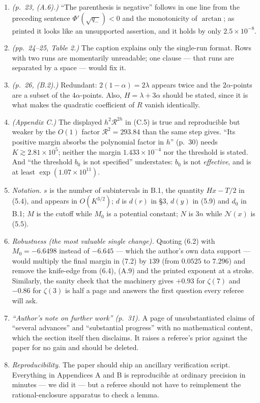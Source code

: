 \documentclass[11pt]{article}
\theoremstyle{definition}
\begin{document}
\begin{enumerate}
three pieces. The cancellation between the zero block and the ordinary block should be described
as a cancellation rather than as an omission.
\item \emph{(p.~23, (A.6).)} ``The parenthesis is negative'' follows in one line from the
preceding sentence $\Phi'(\sqrt{q_-})<0$ and the monotonicity of $\arctan$; as printed it looks
like an unsupported assertion, and it holds by only $2.5\times10^{-8}$.
\item \emph{(pp.~24--25, Table 2.)} The caption explains only the single-run format. Rows with
two runs are momentarily unreadable; one clause --- that runs are separated by a space --- would
fix it.
\item \emph{(p.~26, (B.2).)} Redundant: $2(1-\alpha)=2\lambda$ appears twice and the
$2\alpha$-points are a subset of the $4\alpha$-points. Also, $H=\lambda+3\alpha$ should be stated,
since it is what makes the quadratic coefficient of $R$ vanish identically.
\item \emph{(Appendix C.)} The displayed $h^2\mathcal{R}^{2h}$ in (C.5) is true and reproducible
but weaker by the $O(1)$ factor $\mathcal{R}^2=293.84$ than the same step gives. ``Its positive
margin absorbs the polynomial factor in $h$'' (p.~30) needs $K\gtrsim2.81\times10^5$; neither the
margin $1.433\times10^{-4}$ nor the threshold is stated. And ``the threshold $b_0$ is not
specified'' understates: $b_0$ is not \emph{effective}, and is at least $\exp(1.07\times10^{11})$.
\item \emph{Notation.} $s$ is the number of subintervals in B.1, the quantity $Hx-T/2$ in (5.4),
and appears in $O(K^{3/2})$; $d$ is $d(r)$ in \S3, $d(y)$ in (5.9) and $d_0$ in B.1; $M$ is the
cutoff while $M_0$ is a potential constant; $N$ is $3n$ while $\mathcal{N}(x)$ is (5.5).
\item \emph{Robustness (the most valuable single change).} Quoting (6.2) with
$M_0=-6.6498$ instead of $-6.645$ --- which the author's own data support --- would multiply the
final margin in (7.2) by $139$ (from $0.0525$ to $7.296$) and remove the knife-edge from (6.4),
(A.9) and the printed exponent at a stroke. Similarly, the sanity check that the machinery gives $+0.93$ for $\zeta(7)$
and $-0.86$ for $\zeta(3)$ is half a page and answers the first question every referee will ask.
\item \emph{``Author's note on further work'' (p.~31).} A page of unsubstantiated claims of
``several advances'' and ``substantial progress'' with no mathematical content, which the section
itself then disclaims. It raises a referee's prior against the paper for no gain and should be
deleted.
\item \emph{Reproducibility.} The paper should ship an ancillary verification script. Everything
in Appendices A and B is reproducible at ordinary precision in minutes --- we did it --- but a
referee should not have to reimplement the rational-enclosure apparatus to check a lemma.
\end{enumerate}
\end{document}
